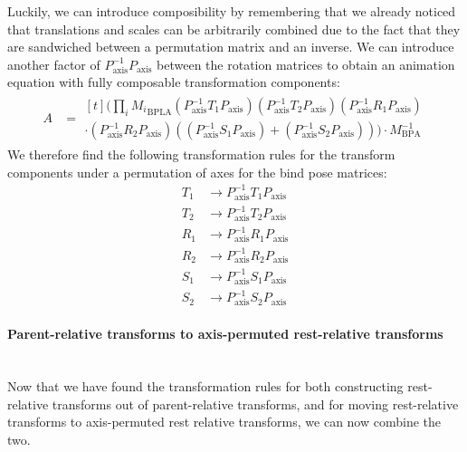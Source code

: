 \documentclass{article}
\begin{document}
Luckily, we can introduce composibility by remembering that we already noticed that translations and scales can be arbitrarily combined due to the fact that they are sandwiched between a permutation matrix and an inverse. We can introduce another factor of $P^{-1}_\mathrm{axis}P_\mathrm{axis}$ between the rotation matrices to obtain an animation equation with fully composable transformation components:
\begin{align}
A &= \begin{multlined}[t]
\Bigg( \prod_{i} {M_i}_\mathrm{BPLA}  \left(P_\mathrm{axis}^{-1} T_1 P_\mathrm{axis} \right)\left(P_\mathrm{axis}^{-1} T_2 P_\mathrm{axis} \right)  \left(  P_\mathrm{axis}^{-1} R_1 P_\mathrm{axis}\right) \\
\cdot  \left( P_\mathrm{axis}^{-1} R_2  P_\mathrm{axis} \right) \left(\left(P_\mathrm{axis}^{-1} S_1 P_\mathrm{axis} \right) + \left( P_\mathrm{axis}^{-1} S_2 P_\mathrm{axis}\right)\right) \Bigg) \cdot M_\mathrm{BPA}^{-1}
\end{multlined}
\end{align}
We therefore find the following transformation rules for the transform components under a permutation of axes for the bind pose matrices:
\begin{align}
T_1 &\to P_\mathrm{axis}^{-1} T_1 P_\mathrm{axis}\\
T_2 &\to P_\mathrm{axis}^{-1} T_2 P_\mathrm{axis}\\
R_1 &\to P_\mathrm{axis}^{-1} R_1 P_\mathrm{axis}\\
R_2 &\to P_\mathrm{axis}^{-1} R_2 P_\mathrm{axis}\\
S_1 &\to P_\mathrm{axis}^{-1} S_1 P_\mathrm{axis}\\
S_2 &\to P_\mathrm{axis}^{-1} S_2 P_\mathrm{axis}
\end{align}

\paragraph{Parent-relative transforms to axis-permuted rest-relative transforms}\mbox{}\\
Now that we have found the transformation rules for both constructing rest-relative transforms out of parent-relative transforms, and for moving rest-relative transforms to axis-permuted rest relative transforms, we can now combine the two.
\end{document}
